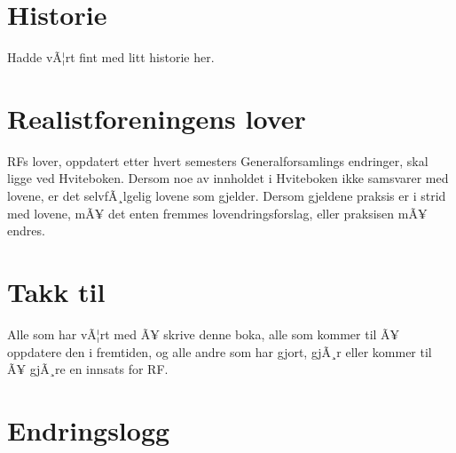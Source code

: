 \documentclass[11pt,norsk,a4paper,pointlessnumbers]{scrbook}
\begin{document}


\chapter{Historie}
Hadde vÃ¦rt fint med litt historie her.

\chapter{Realistforeningens lover}
RFs lover, oppdatert etter hvert semesters Generalforsamlings 
endringer, skal ligge ved Hviteboken. Dersom noe av innholdet
i Hviteboken ikke samsvarer med lovene, er det selvfÃ¸lgelig
lovene som gjelder. Dersom gjeldene praksis er i strid med
lovene, mÃ¥ det enten fremmes lovendringsforslag, eller praksisen
mÃ¥ endres.


\chapter{Takk til}
Alle som har vÃ¦rt med Ã¥ skrive denne boka, alle som kommer til Ã¥ oppdatere den i fremtiden, og alle andre som har gjort, gjÃ¸r eller kommer til Ã¥ gjÃ¸re en innsats for RF.

\chapter{Endringslogg}

\end{document}
